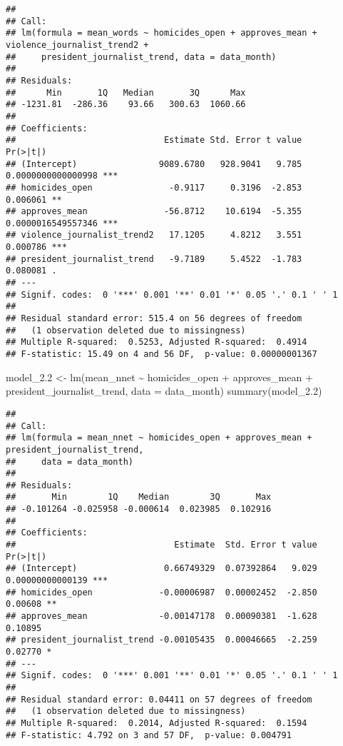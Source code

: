 \documentclass[
]{article}
\newenvironment{Shaded}{\begin{snugshade}}{\end{snugshade}}
\newcommand{\AttributeTok}[1]{\textcolor[rgb]{0.77,0.63,0.00}{#1}}
\newcommand{\FloatTok}[1]{\textcolor[rgb]{0.00,0.00,0.81}{#1}}
\newcommand{\FunctionTok}[1]{\textcolor[rgb]{0.00,0.00,0.00}{#1}}
\newcommand{\NormalTok}[1]{#1}
\newcommand{\OtherTok}[1]{\textcolor[rgb]{0.56,0.35,0.01}{#1}}
\newcommand{\SpecialCharTok}[1]{\textcolor[rgb]{0.00,0.00,0.00}{#1}}
\begin{document}
\begin{verbatim}
## 
## Call:
## lm(formula = mean_words ~ homicides_open + approves_mean + violence_journalist_trend2 + 
##     president_journalist_trend, data = data_month)
## 
## Residuals:
##      Min       1Q   Median       3Q      Max 
## -1231.81  -286.36    93.66   300.63  1060.66 
## 
## Coefficients:
##                             Estimate Std. Error t value           Pr(>|t|)    
## (Intercept)                9089.6780   928.9041   9.785 0.0000000000000998 ***
## homicides_open               -0.9117     0.3196  -2.853           0.006061 ** 
## approves_mean               -56.8712    10.6194  -5.355 0.0000016549557346 ***
## violence_journalist_trend2   17.1205     4.8212   3.551           0.000786 ***
## president_journalist_trend   -9.7189     5.4522  -1.783           0.080081 .  
## ---
## Signif. codes:  0 '***' 0.001 '**' 0.01 '*' 0.05 '.' 0.1 ' ' 1
## 
## Residual standard error: 515.4 on 56 degrees of freedom
##   (1 observation deleted due to missingness)
## Multiple R-squared:  0.5253, Adjusted R-squared:  0.4914 
## F-statistic: 15.49 on 4 and 56 DF,  p-value: 0.00000001367
\end{verbatim}

\begin{Shaded}
\begin{Highlighting}[]
\NormalTok{model\_2}\FloatTok{.2} \OtherTok{\textless{}{-}} \FunctionTok{lm}\NormalTok{(mean\_nnet }\SpecialCharTok{\textasciitilde{}}\NormalTok{ homicides\_open }\SpecialCharTok{+}\NormalTok{ approves\_mean }\SpecialCharTok{+}\NormalTok{ president\_journalist\_trend, }\AttributeTok{data =}\NormalTok{ data\_month)}
\FunctionTok{summary}\NormalTok{(model\_2}\FloatTok{.2}\NormalTok{)}
\end{Highlighting}
\end{Shaded}

\begin{verbatim}
## 
## Call:
## lm(formula = mean_nnet ~ homicides_open + approves_mean + president_journalist_trend, 
##     data = data_month)
## 
## Residuals:
##       Min        1Q    Median        3Q       Max 
## -0.101264 -0.025958 -0.000614  0.023985  0.102916 
## 
## Coefficients:
##                               Estimate  Std. Error t value         Pr(>|t|)    
## (Intercept)                 0.66749329  0.07392864   9.029 0.00000000000139 ***
## homicides_open             -0.00006987  0.00002452  -2.850          0.00608 ** 
## approves_mean              -0.00147178  0.00090381  -1.628          0.10895    
## president_journalist_trend -0.00105435  0.00046665  -2.259          0.02770 *  
## ---
## Signif. codes:  0 '***' 0.001 '**' 0.01 '*' 0.05 '.' 0.1 ' ' 1
## 
## Residual standard error: 0.04411 on 57 degrees of freedom
##   (1 observation deleted due to missingness)
## Multiple R-squared:  0.2014, Adjusted R-squared:  0.1594 
## F-statistic: 4.792 on 3 and 57 DF,  p-value: 0.004791
\end{verbatim}
\end{document}
